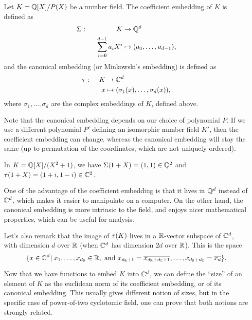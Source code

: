 \begin{definition}
Let $K = \mathbb{Q}[X]/P(X)$ be a number field. The coefficient embedding of $K$ is defined as
\begin{align*}
\coeff: \hspace{15mm} K & \rightarrow \QQ^d \\
\sum_{i=0}^{d-1} a_i X^i &\mapsto	(a_0, \dots, a_{d-1}),
\end{align*}
and the canonical embedding (or Minkowski's embedding) is defined as
\begin{align*}
\tau: \hspace{4mm} K & \rightarrow \mathbb{C}^d \\
x &\mapsto	(\sigma_1(x), \dots, \sigma_d(x)),
\end{align*}
where $\sigma_1, \dots, \sigma_d$ are the complex embeddings of $K$, defined above.
\end{definition}

Note that the canonical embedding depends on our choice of polynomial $P$. If we use a different polynomial $P'$ defining an isomorphic number field $K'$, then the coefficient embedding can change, whereas the canonical embedding will stay the same (up to permutation of the coordinates, which are not uniquely ordered).

\begin{example}
In $K = \mathbb{Q}[X]/(X^2+1)$, we have $\Sigma(1+X) = (1,1) \in \mathbb{Q}^2$ and $\tau(1+X) = (1+i, 1-i) \in \mathbb{C}^2$.
\end{example}

One of the advantage of the coefficient embedding is that it lives in $\mathbb{Q}^d$ instead of $\mathbb{C}^d$, which makes it easier to manipulate on a computer. On the other hand, the canonical embedding is more intrinsic to the field, and enjoys nicer mathematical properties, which can be useful for analysis.

Let's also remark that the image of $\tau(K)$ lives in a $\mathbb{R}$-vector subspace of $\mathbb{C}^d$, with dimension $d$ over $\mathbb{R}$ (when $\mathbb{C}^d$ has dimension $2d$ over $\mathbb{R}$). This is the space
\[\{x \in \mathbb{C}^d \,|\, x_1, \dots, x_{d_{\mathbb{R}}} \in \mathbb{R}, \text{ and } x_{d_{\mathbb{R}}+1} = \overline{x_{d_{\mathbb{R}}+d_{\mathbb{C}}+1}}, \dots, x_{d_{\mathbb{R}}+d_{\mathbb{C}}} = \overline{x_d} \}.\]

Now that we have functions to embed $K$ into $\mathbb{C}^d$, we can define the ``size'' of an element of $K$ as the euclidean norm of its coefficient embedding, or of its canonical embedding. This usually gives different notion of sizes, but in the specific case of power-of-two cyclotomic field, one can prove that both notions are strongly related.

